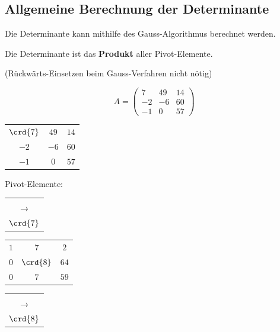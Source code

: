 \subsection{Allgemeine Berechnung der Determinante}

Die Determinante kann mithilfe des Gauss-Algorithmus berechnet werden.

Die Determinante ist das \textbf{Produkt} aller Pivot-Elemente.

(Rückwärts-Einsetzen beim Gauss-Verfahren nicht nötig)

$$A =
\begin{pmatrix}
	7 & 49 & 14 \\
	-2 & -6 & 60 \\
	-1 & 0 & 57 
\end{pmatrix}$$

\begin{minipage}[t]{0.1\columnwidth}
\end{minipage}
\begin{minipage}[t]{0.21\columnwidth}
\centering
\renewcommand{\arraystretch}{1.4}
	\begin{tabular}{|c c c|}
		\hline
		$\crd{7}$  & $49$ & $14$ \\
		$-2$ & $-6$ & $60$ \\
		$-1$ & $0$  & $57$ \\
		\hline
	\end{tabular}
\smallskip
Pivot-Elemente:
\end{minipage}
\begin{minipage}[t]{0.05\columnwidth}
\centering
	\begin{tabular}{c}
		\\\\
		$\rightarrow$\\[1.8em]
		$\crd{7}$
	\end{tabular}
\end{minipage}
\begin{minipage}[t]{0.175\columnwidth}
\centering
\renewcommand{\arraystretch}{1.4}
	\begin{tabular}{|c c c|}
		\hline
		$1$ & $7$ & $2$ \\
		$0$ & $\crd{8}$ & $64$ \\
		$0$ & $7$ & $59$ \\
		\hline
	\end{tabular}
\end{minipage}
\begin{minipage}[t]{0.05\columnwidth}
\centering
	\begin{tabular}{c}
		\\\\
		$\rightarrow$\\[1.8em]
		$\crd{8}$
	\end{tabular}
\end{minipage}
